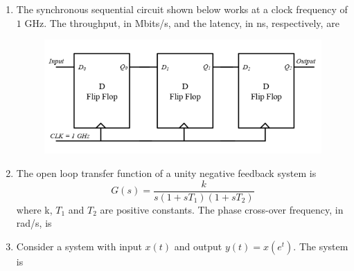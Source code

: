 \documentclass[a4paper, 11pt]{article}
\begin{document}
\begin{enumerate}
    \item The synchronous sequential circuit shown below works at a clock frequency of $1$ GHz. The throughput, in Mbits/s, and the latency, in ns, respectively, are
    \begin{figure}[H]
        \centering
        \includegraphics[width=0.7\columnwidth]{figs/Q14.png}
        \caption*{}
        \label{fig:q24}
    \end{figure}
    \begin{enumerate}
    \end{enumerate}
    
    \hfill{}
    
    \item The open loop transfer function of a unity negative feedback system is
    \[G(s) = \frac{k}{s(1+sT_1)(1+sT_2)}\]
    where k, $T_1$ and $T_2$ are positive constants. The phase cross-over frequency, in rad/s, is
    \begin{enumerate}
    \end{enumerate}

    \hfill{}
    
    \item Consider a system with input $x(t)$ and output $y(t) = x(e^t)$. The system is
    \begin{enumerate}
    \end{enumerate}


\end{enumerate}
\end{document}
